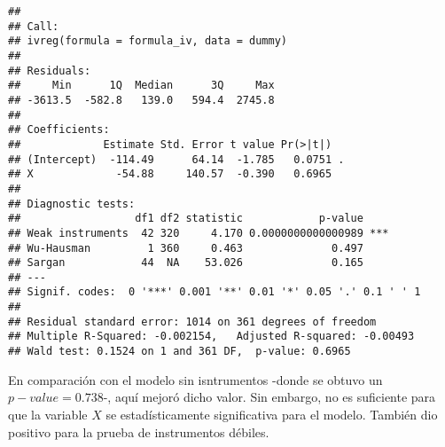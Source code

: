 \documentclass[
]{article}
\begin{document}
\begin{verbatim}
## 
## Call:
## ivreg(formula = formula_iv, data = dummy)
## 
## Residuals:
##     Min      1Q  Median      3Q     Max 
## -3613.5  -582.8   139.0   594.4  2745.8 
## 
## Coefficients:
##             Estimate Std. Error t value Pr(>|t|)  
## (Intercept)  -114.49      64.14  -1.785   0.0751 .
## X             -54.88     140.57  -0.390   0.6965  
## 
## Diagnostic tests:
##                  df1 df2 statistic            p-value    
## Weak instruments  42 320     4.170 0.0000000000000989 ***
## Wu-Hausman         1 360     0.463              0.497    
## Sargan            44  NA    53.026              0.165    
## ---
## Signif. codes:  0 '***' 0.001 '**' 0.01 '*' 0.05 '.' 0.1 ' ' 1
## 
## Residual standard error: 1014 on 361 degrees of freedom
## Multiple R-Squared: -0.002154,   Adjusted R-squared: -0.00493 
## Wald test: 0.1524 on 1 and 361 DF,  p-value: 0.6965
\end{verbatim}

En comparación con el modelo sin isntrumentos -donde se obtuvo un
\(p-value = 0.738\)-, aquí mejoró dicho valor. Sin embargo, no es
suficiente para que la variable \(X\) se estadísticamente significativa
para el modelo. También dio positivo para la prueba de instrumentos
débiles.
\end{document}
